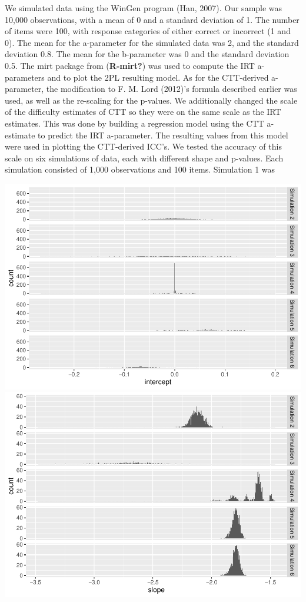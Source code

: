 \documentclass[
  man]{apa6}
\begin{document}
We simulated data using the WinGen program (Han, 2007). Our sample was 10,000 observations, with a mean of 0 and a standard deviation of 1. The number of items were 100, with response categories of either correct or incorrect (1 and 0). The mean for the a-parameter for the simulated data was 2, and the standard deviation 0.8. The mean for the b-parameter was 0 and the standard deviation 0.5. The mirt package from (\textbf{R-mirt?}) was used to compute the IRT a-parameters and to plot the 2PL resulting model. As for the CTT-derived a-parameter, the modification to F. M. Lord (2012)'s formula described earlier was used, as well as the re-scaling for the p-values. We additionally changed the scale of the difficulty estimates of CTT so they were on the same scale as the IRT estimates. This was done by building a regression model using the CTT a-estimate to predict the IRT a-parameter. The resulting values from this model were used in plotting the CTT-derived ICC's.
We tested the accuracy of this scale on six simulations of data, each with different shape and p-values. Each simulation consisted of 1,000 observations and 100 items. Simulation 1 was

\includegraphics{ICC_project_files/figure-latex/unnamed-chunk-1-1.pdf} \includegraphics{ICC_project_files/figure-latex/unnamed-chunk-1-2.pdf}
\end{document}
